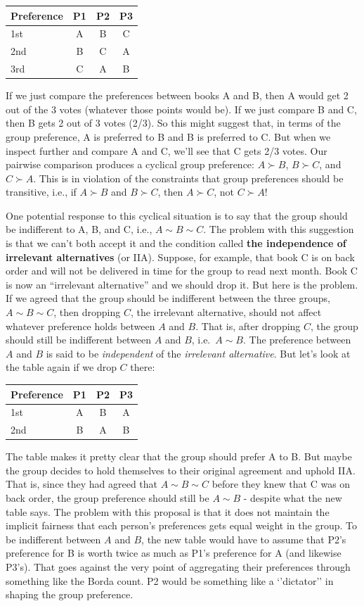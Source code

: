\documentclass[]{tufte-book}
\begin{document}
\begin{longtable}[]{@{}lccc@{}}
\toprule
Preference & P1 & P2 & P3\tabularnewline
\midrule
\endhead
1st & A & B & C\tabularnewline
2nd & B & C & A\tabularnewline
3rd & C & A & B\tabularnewline
\bottomrule
\end{longtable}

If we just compare the preferences between books A and B, then A would get 2 out of the 3 votes (whatever those points would be). If we just compare B and C, then B gets 2 out of 3 votes (2/3). So this might suggest that, in terms of the group preference, A is preferred to B and B is preferred to C. But when we inspect further and compare A and C, we'll see that C gets 2/3 votes. Our pairwise comparison produces a cyclical group preference: \(A\succ B\), \(B\succ C\), and \(C\succ A\). This is in violation of the constraints that group preferences should be transitive, i.e., if \(A\succ B\) and \(B\succ C\), then \(A\succ C\), not \(C\succ A\)!

One potential response to this cyclical situation is to say that the group should be indifferent to A, B, and C, i.e., \(A\sim B\sim C\). The problem with this suggestion is that we can't both accept it and the condition called \textbf{the independence of irrelevant alternatives} (or IIA). Suppose, for example, that book C is on back order and will not be delivered in time for the group to read next month. Book C is now an ``irrelevant alternative'' and we should drop it. But here is the problem. If we agreed that the group should be indifferent between the three groups, \(A\sim B\sim C\), then dropping \(C\), the irrelevant alternative, should not affect whatever preference holds between \(A\) and \(B\). That is, after dropping \(C\), the group should still be indifferent between \(A\) and \(B\), i.e.~\(A\sim B\). The preference between \(A\) and \(B\) is said to be \emph{independent} of the \emph{irrelevant alternative}. But let's look at the table again if we drop \(C\) there:

\begin{longtable}[]{@{}lccc@{}}
\toprule
Preference & P1 & P2 & P3\tabularnewline
\midrule
\endhead
1st & A & B & A\tabularnewline
2nd & B & A & B\tabularnewline
\bottomrule
\end{longtable}

The table makes it pretty clear that the group should prefer A to B. But maybe the group decides to hold themselves to their original agreement and uphold IIA. That is, since they had agreed that \(A\sim B\sim C\) before they knew that C was on back order, the group preference should still be \(A\sim B\) - despite what the new table says. The problem with this proposal is that it does not maintain the implicit fairness that each person's preferences gets equal weight in the group. To be indifferent between \(A\) and \(B\), the new table would have to assume that P2's preference for B is worth twice as much as P1's preference for A (and likewise P3's). That goes against the very point of aggregating their preferences through something like the Borda count. P2 would be something like a `'dictator'' in shaping the group preference.
\end{document}

